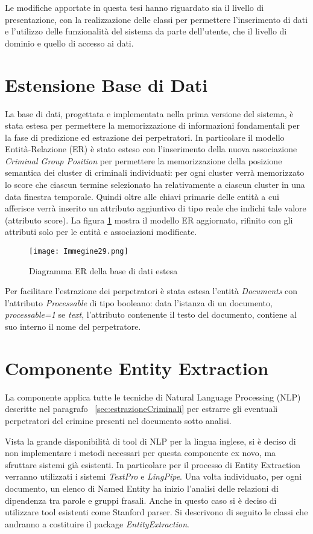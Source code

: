 Le modifiche apportate in questa tesi hanno riguardato sia il livello di presentazione, con la realizzazione delle classi per permettere l'inserimento di dati e l'utilizzo delle funzionalità del sistema da parte dell'utente, che il livello di dominio e quello di accesso ai dati.

\section{Estensione Base di Dati}
La base di dati, progettata e implementata nella prima versione del sistema, è stata estesa per permettere la memorizzazione di informazioni fondamentali per la fase di predizione ed estrazione dei perpetratori.
In particolare il modello Entità-Relazione (ER) è stato esteso con l'inserimento della nuova associazione \textit{Criminal Group Position} per permettere la memorizzazione della posizione semantica dei cluster di criminali individuati: per ogni cluster verrà memorizzato lo score che ciascun termine selezionato ha relativamente a ciascun cluster in una data finestra temporale. Quindi oltre alle chiavi primarie delle entità a cui afferisce verrà inserito un attributo aggiuntivo di tipo reale che indichi tale valore (attributo score). 
La figura \ref{ER} mostra il modello ER aggiornato, rifinito con gli attributi solo per le entità e associazioni modificate.
\begin{figure}[H]
	\centering
	\texttt{[image: Immegine29.png]}
	\caption{Diagramma ER della base di dati estesa}
	\label{ER}
\end{figure}

Per facilitare l'estrazione dei perpetratori è stata estesa l'entità \textit{Documents} con l'attributo \textit{Processable} di tipo booleano: data l'istanza di un documento, \textit{processable=1} se \textit{text}, l'attributo contenente il testo del documento, contiene al suo interno il nome del perpetratore. 
\section{Componente Entity Extraction}
La componente applica tutte le tecniche di Natural Language Processing (NLP) descritte nel paragrafo ~\ref{sec:estrazioneCriminali} per estrarre gli eventuali perpetratori del crimine presenti nel documento sotto analisi.

Vista la grande disponibilità di tool di NLP per la lingua inglese, si è deciso di non implementare i metodi necessari per questa componente ex novo, ma sfruttare sistemi già esistenti.
In particolare per il processo di Entity Extraction verranno utilizzati i sistemi \textit{TextPro}\cite{TextPro} e \textit{LingPipe}\cite{nlp:LingPipe}. 
Una volta individuato, per ogni documento, un elenco di Named Entity ha inizio l'analisi delle relazioni di dipendenza tra parole e gruppi frasali. Anche in questo caso si è deciso di utilizzare tool esistenti come Stanford parser\cite{Marneffe06}.
Si descrivono di seguito le classi che andranno a costituire il package \textit{EntityExtraction}.

